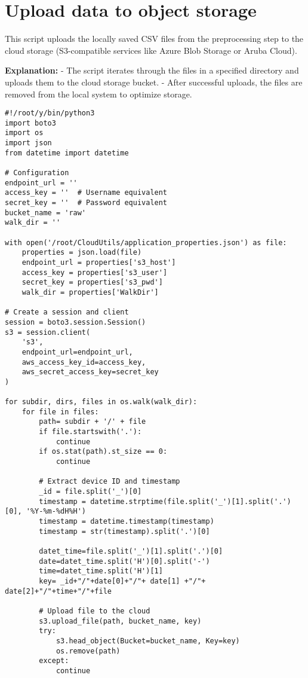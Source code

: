 \section{Upload data to object storage}
\label{sec:upload_cloudcloud_impl}

This script uploads the locally saved CSV files from the preprocessing step to the cloud storage (S3-compatible services like Azure Blob Storage or Aruba Cloud).

\textbf{Explanation:}  
- The script iterates through the files in a specified directory and uploads them to the cloud storage bucket.  
- After successful uploads, the files are removed from the local system to optimize storage.

\begin{verbatim}
#!/root/y/bin/python3
import boto3
import os
import json
from datetime import datetime

# Configuration
endpoint_url = ''
access_key = ''  # Username equivalent
secret_key = ''  # Password equivalent
bucket_name = 'raw'
walk_dir = ''

with open('/root/CloudUtils/application_properties.json') as file:
    properties = json.load(file)
    endpoint_url = properties['s3_host']
    access_key = properties['s3_user']
    secret_key = properties['s3_pwd']
    walk_dir = properties['WalkDir']

# Create a session and client
session = boto3.session.Session()
s3 = session.client(
    's3',
    endpoint_url=endpoint_url,
    aws_access_key_id=access_key,
    aws_secret_access_key=secret_key
)

for subdir, dirs, files in os.walk(walk_dir):
    for file in files:
        path= subdir + '/' + file
        if file.startswith('.'):
            continue
        if os.stat(path).st_size == 0:
            continue

        # Extract device ID and timestamp
        _id = file.split('_')[0]
        timestamp = datetime.strptime(file.split('_')[1].split('.')[0], '%Y-%m-%dH%H')
        timestamp = datetime.timestamp(timestamp)
        timestamp = str(timestamp).split('.')[0]

        datet_time=file.split('_')[1].split('.')[0]
        date=datet_time.split('H')[0].split('-')
        time=datet_time.split('H')[1]
        key= _id+"/"+date[0]+"/"+ date[1] +"/"+ date[2]+"/"+time+"/"+file

        # Upload file to the cloud
        s3.upload_file(path, bucket_name, key)
        try:
            s3.head_object(Bucket=bucket_name, Key=key)
            os.remove(path)
        except:
            continue
\end{verbatim}

